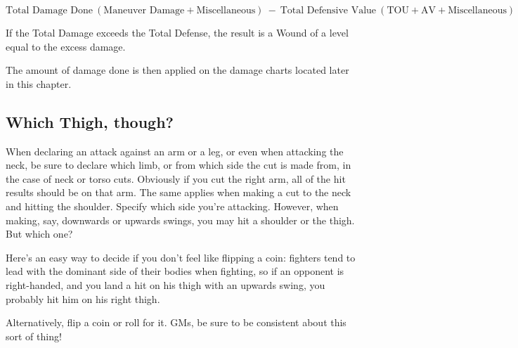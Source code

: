 \documentclass[oneside,11pt,english]{book}
\begin{document}
\[\text{Total Damage Done}~(\text{Maneuver Damage}+\text{Miscellaneous}) ~-~ \text{Total Defensive Value}~(\text{TOU}+\text{AV} + \text{Miscellaneous})\]

If the Total Damage exceeds the Total Defense, the result is a Wound of a level equal to the excess 
damage.

The amount of damage done is then applied on the damage charts located later in this chapter.

\subsection*{Which Thigh, though?}
When declaring an attack against an arm or a leg, or even when attacking the neck, be sure to declare 
which limb, or from which side the cut is made from, in the case of neck or torso cuts. Obviously if you 
cut the right arm, all of the hit results should be on that arm. The same applies when making a cut to the 
neck and hitting the shoulder. Specify which side you’re attacking.
However, when making, say, downwards or upwards swings, you may hit a shoulder or the thigh. But 
which one?

Here’s an easy way to decide if you don’t feel like flipping a coin: fighters tend to lead with the dominant 
side of their bodies when fighting, so if an opponent is right-handed, and you land a hit on his thigh with 
an upwards swing, you probably hit him on his right thigh.

Alternatively, flip a coin or roll for it. GMs, be sure to be consistent about this sort of thing!

\newpage
\end{document}
